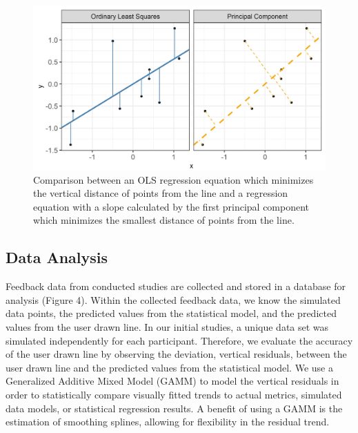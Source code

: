 \documentclass[10pt]{article}
\begin{document}
\begin{figure}[ht]
\begin{center}
\centerline{\includegraphics[width=\columnwidth]{images/pca-plot}}
\caption{Comparison between an OLS regression equation which minimizes the vertical distance of points from the line and a regression equation with a slope calculated by the first principal component which minimizes the smallest distance of points from the line.}
\label{pca-plot}
\end{center}
\end{figure}

\subsection{Data Analysis}

Feedback data from conducted studies are collected and stored in a
database for analysis (Figure 4). Within the collected feedback data, we
know the simulated data points, the predicted values from the
statistical model, and the predicted values from the user drawn line. In
our initial studies, a unique data set was simulated independently for
each participant. Therefore, we evaluate the accuracy of the user drawn
line by observing the deviation, vertical residuals, between the user
drawn line and the predicted values from the statistical model. We use a
Generalized Additive Mixed Model (GAMM) to model the vertical residuals
in order to statistically compare visually fitted trends to actual
metrics, simulated data models, or statistical regression results. A
benefit of using a GAMM is the estimation of smoothing splines, allowing
for flexibility in the residual trend.
\end{document}
